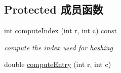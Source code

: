 \subsection*{Protected 成员函数}
\begin{DoxyCompactItemize}
\item 
\hypertarget{classg2o_1_1MarginalCovarianceCholesky_a51578d6676018d54d74dfe8ce70a9d4b}{int \hyperlink{classg2o_1_1MarginalCovarianceCholesky_a51578d6676018d54d74dfe8ce70a9d4b}{compute\-Index} (int r, int c) const }\label{classg2o_1_1MarginalCovarianceCholesky_a51578d6676018d54d74dfe8ce70a9d4b}

\begin{DoxyCompactList}\small\item\em compute the index used for hashing \end{DoxyCompactList}\item 
double \hyperlink{classg2o_1_1MarginalCovarianceCholesky_a556f8da80f0873b74b57c82b587b4f97}{compute\-Entry} (int r, int c)
\end{DoxyCompactItemize}
